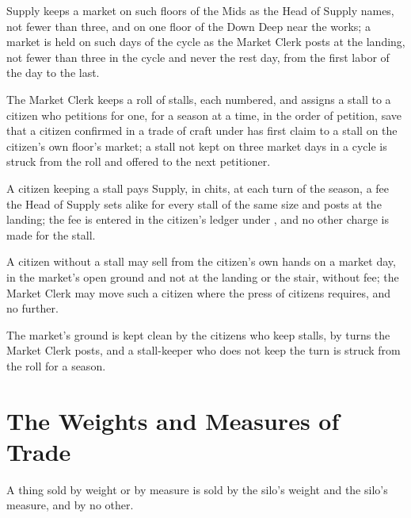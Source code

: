 \begin{clauses}
\item Supply keeps a market on such floors of the Mids as the Head of Supply names, not fewer than three, and on one floor of the Down Deep near the works; a market is held on such days of the cycle as the Market Clerk posts at the landing, not fewer than three in the cycle and never the rest day, from the first labor of the day to the last.
\item The Market Clerk keeps a roll of stalls, each numbered, and assigns a stall to a citizen who petitions for one, for a season at a time, in the order of petition, save that a citizen confirmed in a trade of craft under  has first claim to a stall on the citizen's own floor's market; a stall not kept on three market days in a cycle is struck from the roll and offered to the next petitioner.
\item A citizen keeping a stall pays Supply, in chits, at each turn of the season, a fee the Head of Supply sets alike for every stall of the same size and posts at the landing; the fee is entered in the citizen's ledger under , and no other charge is made for the stall.
\item A citizen without a stall may sell from the citizen's own hands on a market day, in the market's open ground and not at the landing or the stair, without fee; the Market Clerk may move such a citizen where the press of citizens requires, and no further.
\item The market's ground is kept clean by the citizens who keep stalls, by turns the Market Clerk posts, and a stall-keeper who does not keep the turn is struck from the roll for a season.
\end{clauses}

\section{The Weights and Measures of Trade}
\label{sec:commerce:weights-and-measures-of-trade}

A thing sold by weight or by measure is sold by the silo's weight and the silo's measure, and by no other.

